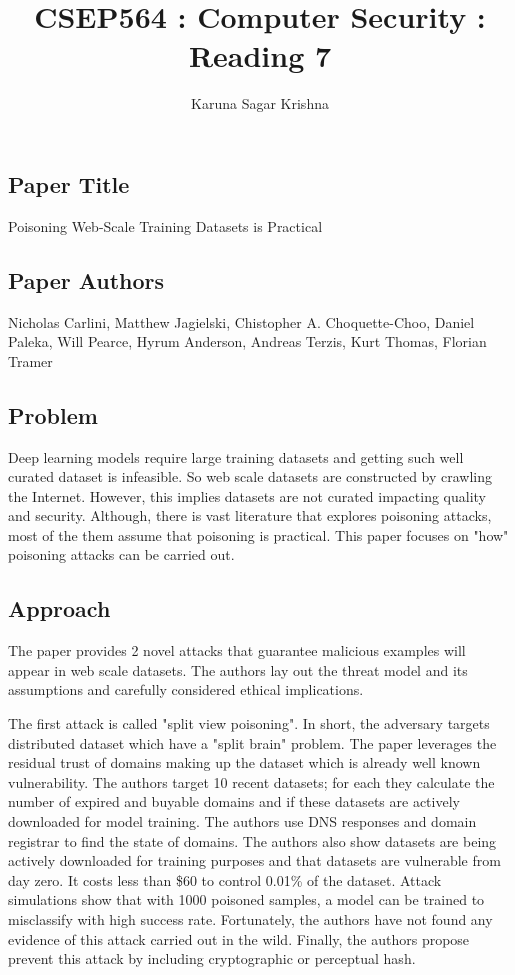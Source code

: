 \documentclass[12pt]{article}
\title{CSEP564 : Computer Security : Reading 7}
\author{Karuna Sagar Krishna}
\begin{document}
    \maketitle

    \subsection*{Paper Title}
    Poisoning Web-Scale Training Datasets is Practical

    \subsection*{Paper Authors}
    Nicholas Carlini, Matthew Jagielski, Chistopher A. Choquette-Choo, Daniel Paleka, Will Pearce, Hyrum Anderson, Andreas Terzis, Kurt Thomas, Florian Tramer

    \subsection*{Problem}
    Deep learning models require large training datasets and getting such well curated dataset is infeasible. So web scale datasets are constructed by crawling the Internet. However, this implies datasets are not curated impacting quality and security. Although, there is vast literature that explores poisoning attacks, most of the them assume that poisoning is practical. This paper focuses on "how" poisoning attacks can be carried out.

    \subsection*{Approach}
    The paper provides 2 novel attacks that guarantee malicious examples will appear in web scale datasets. The authors lay out the threat model and its assumptions and carefully considered ethical implications.

    The first attack is called "split view poisoning". In short, the adversary targets distributed dataset which have a "split brain" problem. The paper leverages the residual trust of domains making up the dataset which is already well known vulnerability. The authors target 10 recent datasets; for each they calculate the number of expired and buyable domains and if these datasets are actively downloaded for model training. The authors use DNS responses and domain registrar to find the state of domains. The authors also show datasets are being actively downloaded for training purposes and that datasets are vulnerable from day zero. It costs less than \$60 to control 0.01\% of the dataset. Attack simulations show that with 1000 poisoned samples, a model can be trained to misclassify with high success rate. Fortunately, the authors have not found any evidence of this attack carried out in the wild. Finally, the authors propose prevent this attack by including cryptographic or perceptual hash.
\end{document}
